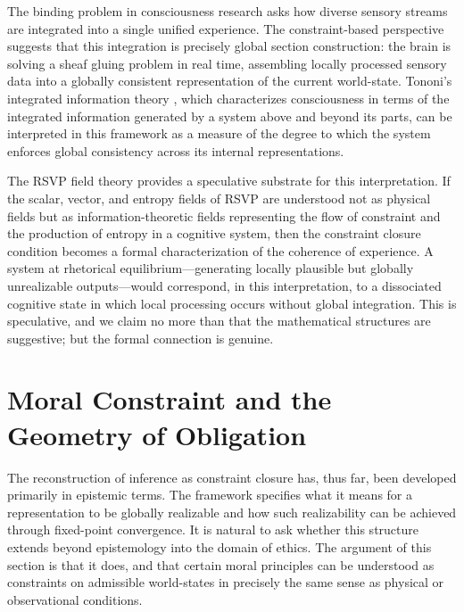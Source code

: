 \documentclass[11pt, oneside]{article}
\begin{document}
The binding problem in consciousness research asks how diverse sensory streams are integrated into a single unified experience. The constraint-based perspective suggests that this integration is precisely global section construction: the brain is solving a sheaf gluing problem in real time, assembling locally processed sensory data into a globally consistent representation of the current world-state. Tononi's integrated information theory \cite{tononi2008}, which characterizes consciousness in terms of the integrated information generated by a system above and beyond its parts, can be interpreted in this framework as a measure of the degree to which the system enforces global consistency across its internal representations.

The RSVP field theory provides a speculative substrate for this interpretation. If the scalar, vector, and entropy fields of RSVP are understood not as physical fields but as information-theoretic fields representing the flow of constraint and the production of entropy in a cognitive system, then the constraint closure condition becomes a formal characterization of the coherence of experience. A system at rhetorical equilibrium---generating locally plausible but globally unrealizable outputs---would correspond, in this interpretation, to a dissociated cognitive state in which local processing occurs without global integration. This is speculative, and we claim no more than that the mathematical structures are suggestive; but the formal connection is genuine.

\section{Moral Constraint and the Geometry of Obligation}

The reconstruction of inference as constraint closure has, thus far, been developed primarily in epistemic terms. The framework specifies what it means for a representation to be globally realizable and how such realizability can be achieved through fixed-point convergence. It is natural to ask whether this structure extends beyond epistemology into the domain of ethics. The argument of this section is that it does, and that certain moral principles can be understood as constraints on admissible world-states in precisely the same sense as physical or observational conditions.
\end{document}
